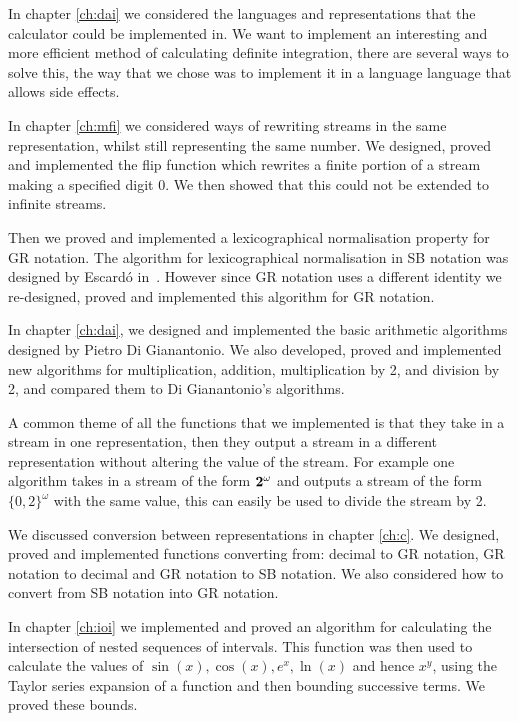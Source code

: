 \documentclass{cs4rep}
\begin{document}
In chapter \ref{ch:dai} we considered the languages and
representations that the calculator could be implemented in. We want
to implement an interesting and more efficient method of calculating
definite integration, there are several ways to solve this, the way
that we chose was to implement it in a language language that allows
side effects.

In chapter \ref{ch:mfi} we considered ways of rewriting streams in
the same representation, whilst still representing the same number. We
designed, proved and implemented the flip function which rewrites a
finite portion of a stream making a specified digit 0. We then showed
that this could not be extended to infinite streams.

Then we proved and implemented a lexicographical normalisation
property for GR notation. The algorithm for lexicographical
normalisation in SB notation was designed by
Escard\'o in~\cite{kn:Escardo}. However since GR notation uses a different
identity we re-designed, proved and implemented this algorithm for GR
notation.

In chapter \ref{ch:dai}, we designed and implemented the basic
arithmetic algorithms designed by Pietro Di Gianantonio. We also
developed, proved and implemented new algorithms for multiplication,
addition, multiplication by 2, and division by 2, and compared them to
Di Gianantonio's algorithms.

A common theme of all the functions that we implemented is that they
take in a stream in one representation, then they output a stream in a
different representation without altering the value of the stream. For
example one algorithm takes in a stream of the form ${\bf 2}^{\omega}$
and outputs a stream of the form $\{0,2\}^{\omega}$ with the same
value, this can easily be used to divide the stream by 2.

We discussed conversion between representations in chapter \ref{ch:c}.
We designed, proved and implemented functions converting from: decimal
to GR notation, GR notation to decimal and GR notation to SB notation.
We also considered how to convert from SB notation into GR notation.

In chapter \ref{ch:ioi} we implemented and proved an algorithm for
calculating the intersection of nested sequences of intervals. This
function was then used to calculate the values of $\sin(x), \cos(x),
e^{x}, \ln(x)$ and hence $x^{y}$, using the Taylor series expansion of
a function and then bounding successive terms. We proved these bounds.
\end{document}
